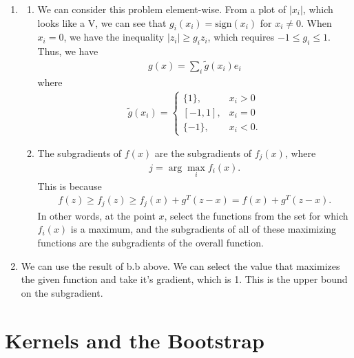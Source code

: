 \documentclass{article}
\begin{document}
\begin{enumerate}
        \item
        \begin{enumerate}
        \item We can consider this problem element-wise.
        From a plot of $|x_i|$, which looks like a V, we can see that $g_i(x_i) = \mathrm{sign}(x_i)$ for $x_i \neq 0$.
        When $x_i = 0$, we have the inequality $|z_i| \geq g_i z_i$, which requires $-1 \leq g_i \leq 1$.
        Thus, we have
        \begin{align*}
                g(x) = \sum_i \tilde{g}(x_i) e_i
        \end{align*}
        where
        \begin{align*}
                \tilde{g}(x_i) = \begin{cases}
                        \{1\}, & x_i > 0 \\
                        [-1,1], & x_i = 0 \\
                        \{-1\}, & x_i < 0 .
                \end{cases}
        \end{align*}
        
        \item The subgradients of $f(x)$ are the subgradients of $f_j(x)$, where
        \begin{align*}
                j = \arg\max_i f_i(x).
        \end{align*}
        This is because
        \begin{align*}
                f(z) \geq f_j(z) \geq f_j(x) + g^T (z - x) = f(x) + g^T (z - x).
        \end{align*}
        In other words, at the point $x$, select the functions from the set for which $f_i(x)$ is a maximum, and the subgradients of all of these maximizing functions are the subgradients of the overall function.
        \end{enumerate}

        \item We can use the result of b.b above.
        We can select the value that maximizes the given function and take it's gradient, which is 1.
        This is the upper bound on the subgradient.
\end{enumerate}

\section*{Kernels and the Bootstrap}
\end{document}
